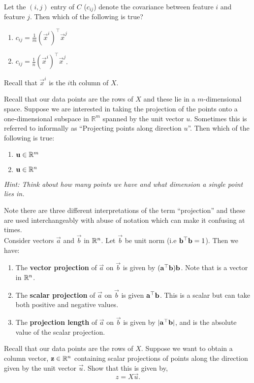 \begin{enumerate}
\sol{

}

\qitem Let the $(i,j)$ entry of $C$ ($c_{ij}$) denote the covariance between feature $i$ and feature $j$. Then which of the following is true?
\begin{enumerate}
    \item $c_{ij} = \frac{1}{m}(\vec{x}^i)^\top \vec{x}^j$
    \item $c_{ij} = \frac{1}{n}(\vec{x}^i)^\top \vec{x}^j$.
\end{enumerate}
Recall that $\vec{x}^i$ is the $i$th column of $X$.

\sol{

}


\qitem Recall that our data points are the rows of $X$ and these lie in a $m$-dimensional space. Suppose we are interested in taking the projection of the points onto a one-dimensional subspace  in $\mathbb{R}^m$ spanned by the unit vector $u$.  Sometimes this is referred to informally  as ``Projecting points along direction $u$''. Then which of the following is true:
\begin{enumerate}
    \item $\mathbf{u} \in \mathbb{R}^{m}$
    \item $\mathbf{u} \in \mathbb{R}^{n}$
\end{enumerate}
\emph{Hint: Think about how many points we have and what dimension a single point lies in.}


\sol{

}
\qitem Note there are three different interpretations of the term ``projection'' and these are used interchangeably with abuse of notation which can make it confusing at times.\\ Consider vectors $\vec{a}$ and $\vec{b}$ in $\mathbb{R}^{n}$. Let $\vec{b}$ be unit norm (i.e $\mathbf{b}^{\top} \mathbf{b} = 1$). Then we have:
\begin{enumerate}
    \item The \textbf{vector projection} of $\vec{a}$ on $\vec{b}$ is given by $(\mathbf{a}^{\top} \mathbf{b})\mathbf{b}$. Note that is a vector in $\mathbb{R}^{n}$.
    \item The \textbf{scalar projection} of $\vec{a}$ on $\vec{b}$ is given $\mathbf{a}^{\top} \mathbf{b}$. This is a scalar but can take both positive and negative values.
    \item The \textbf{projection length} of $\vec{a}$ on $\vec{b}$ is given by $|\mathbf{a} ^{\top} \mathbf{b}|$, and is the absolute value of the scalar projection.
\end{enumerate}
Recall that our data points are the rows of $X$. Suppose we want to obtain a column vector, $\mathbf{z} \in \mathbb{R}^{n}$ containing scalar projections of points along the direction given by the unit vector $\vec{u}$. Show that this is given by, 
\begin{equation*}
    z = X\vec{u}.
\end{equation*}


\end{enumerate}
